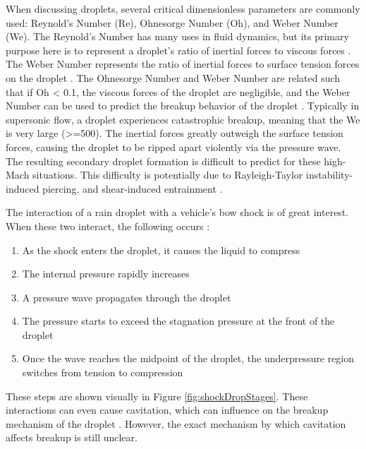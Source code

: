 \documentclass{UCF_ETD}
\begin{document}
When discussing droplets, several critical dimensionless parameters are commonly used: Reynold’s Number (Re), Ohnesorge Number (Oh), and Weber Number (We). The Reynold’s Number has many uses in fluid dynamics, but its primary purpose here is to represent a droplet’s ratio of inertial forces to viscous forces \cite{Cao2020NumericalSO}. The Weber Number represents the ratio of inertial forces to surface tension forces on the droplet \cite{Cao2020NumericalSO}. The Ohnesorge Number and Weber Number are related such that if Oh < 0.1, the viscous forces of the droplet are negligible, and the Weber Number can be used to predict the breakup behavior of the droplet \cite{Cao2020NumericalSO}. Typically in supersonic flow, a droplet experiences catastrophic breakup, meaning that the We is very large (>=500). The inertial forces greatly outweigh the surface tension forces, causing the droplet to be ripped apart violently via the pressure wave. The resulting secondary droplet formation is difficult to predict for these high-Mach situations. This difficulty is potentially due to Rayleigh-Taylor instability-induced piercing, and shear-induced entrainment \cite{Theofanus}. 

The interaction of a rain droplet with a vehicle's bow shock is of great interest. When these two interact, the following occurs \cite{Moylan2010RaindropDI, Forehand2024}:

\begin{enumerate}
    \item As the shock enters the droplet, it causes the liquid to compress
    \item The internal pressure rapidly increases
    \item A pressure wave propagates through the droplet
    \item The pressure starts to exceed the stagnation pressure at the front of the droplet
    \item Once the wave reaches the midpoint of the droplet, the underpressure region switches from tension to compression
\end{enumerate}

These steps are shown visually in Figure \ref{fig:shockDropStages}. These interactions can even cause cavitation, which can influence on the breakup mechanism of the droplet \cite{Briggs2024, Forehand2024}. However, the exact mechanism by which cavitation affects breakup is still unclear.
\end{document}
